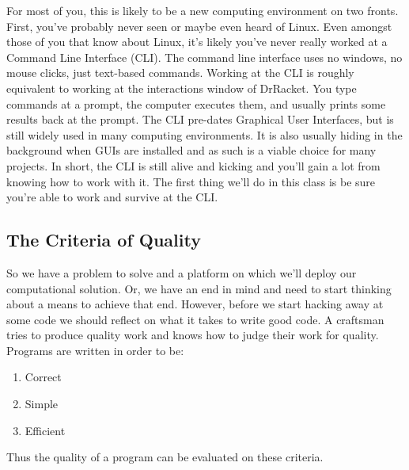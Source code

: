 \documentclass[]{tufte-handout}
\begin{document}
For most of you, this is likely to be a new computing environment on two fronts.  First, you've probably never seen or maybe even heard of Linux.  Even amongst those of you that know about Linux, it's likely you've never really worked at a Command Line Interface (CLI).  The command line interface uses no windows, no mouse clicks, just text-based commands.  Working at the CLI is roughly equivalent to working at the interactions window of DrRacket. You type commands at a prompt, the computer executes them, and usually prints some results back at the prompt. The CLI pre-dates Graphical User Interfaces, but is still widely used in many computing environments.  It is also usually hiding in the background when GUIs are installed and as such is a viable choice for many projects. In short, the CLI is still alive and kicking and you'll gain a lot from knowing how to work with it.  The first thing we'll do in this class is be sure you're able to work and survive at the CLI.

\subsection{The Criteria of Quality}

So we have a problem to solve and a platform on which we'll deploy our computational solution. Or, we have an end in mind and need to start thinking about a means to achieve that end.  However, before we start hacking away at some code we should reflect on what it takes to write good code. A craftsman tries to produce quality work and knows how to judge their work for quality. Programs are written in order to be:
\begin{enumerate}
\item Correct 
\item Simple
\item Efficient
\end{enumerate}
Thus the quality of a program can be evaluated on these criteria. 
\end{document}
